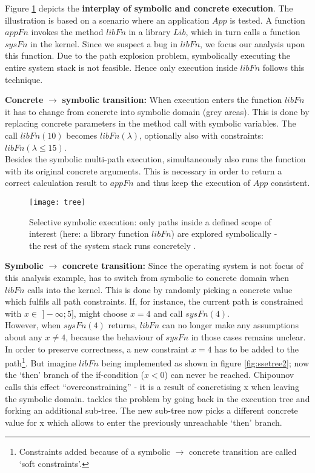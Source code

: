 
Figure \ref{fig:ssetree} depicts the \textbf{interplay of symbolic and concrete execution}.
The illustration is based on a scenario where an application $App$ is tested.
A function $appFn$ invokes the method $libFn$ in a library $Lib$, which in turn calls a function $sysFn$ in the kernel.
Since we suspect a bug in $libFn$, we focus our analysis upon this function.
Due to the path explosion problem, symbolically executing the entire system stack is not feasible.
Hence only execution inside $libFn$ follows this technique.

\medskip
\textbf{Concrete} $\rightarrow$ \textbf{symbolic transition:}
When execution enters the function $libFn$ it has to change from concrete into symbolic domain (grey areas).
This is done by replacing concrete parameters in the method call with symbolic variables.
The call $libFn(10)$ becomes $libFn(\lambda)$, optionally also with constraints: $libFn(\lambda \le 15)$.\\
Besides the symbolic multi-path execution, \sse simultaneously also runs the function with its original concrete arguments.
This is necessary in order to return a correct calculation result to $appFn$ and thus keep the execution of $App$ consistent.


\begin{figure}
\texttt{[image: tree]}
\caption{Selective symbolic execution: only paths inside a defined scope of interest (here: a library function $libFn$) are explored symbolically - the rest of the system stack runs concretely \cite{chip14s2e}.}
\label{fig:ssetree}
\end{figure}

\medskip
\textbf{Symbolic} $\rightarrow$ \textbf{concrete transition:}
Since the operating system is not focus of this analysis example, \sse has to switch from symbolic to concrete domain when $libFn$ calls into the kernel.
This is done by randomly picking a concrete value which fulfils all path constraints.
If, for instance, the current path is constrained with $x \in$ $]-\infty;5]$, \sse might choose $x=4$ and call $sysFn(4)$.\\
However, when $sysFn(4)$ returns, $libFn$ can no longer make any assumptions about any $x \neq 4$, because the behaviour of $sysFn$ in those cases remains unclear.
In order to preserve correctness, a new constraint $x = 4$ has to be added to the path\footnote{Constraints added because of a symbolic $\rightarrow$ concrete transition are called `soft constraints'.}.
But imagine $libFn$ being implemented as shown in figure \ref{fig:ssetree2}; now the `then' branch of the if-condition ($x < 0$) can never be reached.
Chipounov calls this effect ``overconstraining'' \cite{chip14s2e} - it is a result of concretising x when leaving the symbolic domain.
\sse tackles the problem by going back in the execution tree and forking an additional sub-tree.
The new sub-tree now picks a different concrete value for x which allows to enter the previously unreachable `then' branch.

